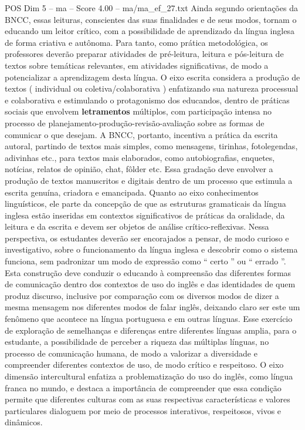 \begin{textsample}{POS Dim 5 – ma – Score 4.00 – ma/ma\_ef\_27.txt}
Ainda segundo orientações da BNCC, essas leituras, conscientes das suas finalidades e de seus modos, tornam o educando um leitor crítico, com a possibilidade de aprendizado da língua inglesa de forma criativa e autônoma.
Para tanto, como prática metodológica, os professores deverão preparar atividades de pré-leitura, leitura e pós-leitura de textos sobre temáticas relevantes, em atividades significativas, de modo a potencializar a aprendizagem desta língua.
O eixo escrita considera a produção de textos ( individual ou coletiva/colaborativa ) enfatizando sua natureza processual e colaborativa e estimulando o protagonismo dos educandos, dentro de práticas sociais que envolvem \textbf{letramentos} múltiplos, com participação intensa no processo de planejamento-produção-revisão-avaliação sobre as formas de comunicar o que desejam.
A BNCC, portanto, incentiva a prática da escrita autoral, partindo de textos mais simples, como mensagens, tirinhas, fotolegendas, adivinhas etc., para textos mais elaborados, como autobiografias, enquetes, notícias, relatos de opinião, chat, fôlder etc.
Essa gradação deve envolver a produção de textos manuscritos e digitais dentro de um processo que estimula a escrita genuína, criadora e emancipada.
Quanto ao eixo conhecimentos linguísticos, ele parte da concepção de que as estruturas gramaticais da língua inglesa estão inseridas em contextos significativos de práticas da oralidade, da leitura e da escrita e devem ser objetos de análise crítico-reflexivas.
Nessa perspectiva, os estudantes deverão ser encorajados a pensar, de modo curioso e investigativo, sobre o funcionamento da língua inglesa e descobrir como o sistema funciona, sem padronizar um modo de expressão como “ certo ” ou “ errado ”.
Esta construção deve conduzir o educando à compreensão das diferentes formas de comunicação dentro dos contextos de uso do inglês e das identidades de quem produz discurso, inclusive por comparação com os diversos modos de dizer a mesma mensagem nos diferentes modos de falar inglês, deixando claro ser este um fenômeno que acontece na língua portuguesa e em outras línguas.
Esse exercício de exploração de semelhanças e diferenças entre diferentes línguas amplia, para o estudante, a possibilidade de perceber a riqueza das múltiplas línguas, no processo de comunicação humana, de modo a valorizar a diversidade e compreender diferentes contextos de uso, de modo crítico e respeitoso.
O eixo dimensão intercultural enfatiza a problematização do uso do inglês, como língua franca no mundo, e destaca a importância de compreender que essa condição permite que diferentes culturas com as suas respectivas características e valores particulares dialoguem por meio de processos interativos, respeitosos, vivos e dinâmicos.

\end{textsample}

